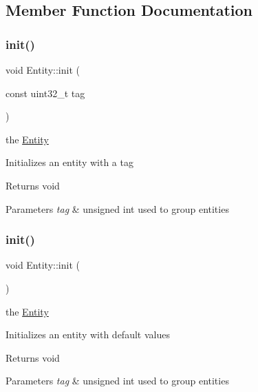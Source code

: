 \subsection{Member Function Documentation}
\mbox{\label{class_entity_a085fa2dd2c2b1f3f60d601a68d5c6773}} 
\subsubsection{\texorpdfstring{init()}{init()}\hspace{0.1cm}{\footnotesize\ttfamily [1/2]}}
{\footnotesize\ttfamily void Entity\+::init (\begin{DoxyParamCaption}\item[{const uint32\+\_\+t}]{tag }\end{DoxyParamCaption})}

the \hyperlink{class_entity}{Entity}

Initializes an entity with a tag

\begin{DoxyReturn}{Returns}
void 
\end{DoxyReturn}

\begin{DoxyParams}{Parameters}
{\em tag} & unsigned int used to group entities \\
\hline
\end{DoxyParams}
\mbox{\label{class_entity_a93bfb0b92c06297c207fad4164810fed}} 
\subsubsection{\texorpdfstring{init()}{init()}\hspace{0.1cm}{\footnotesize\ttfamily [2/2]}}
{\footnotesize\ttfamily void Entity\+::init (\begin{DoxyParamCaption}{ }\end{DoxyParamCaption})}

the \hyperlink{class_entity}{Entity}

Initializes an entity with default values

\begin{DoxyReturn}{Returns}
void 
\end{DoxyReturn}

\begin{DoxyParams}{Parameters}
{\em tag} & unsigned int used to group entities \\
\hline
\end{DoxyParams}
\mbox{\label{class_entity_ad40f9e3ddaa375d33c930c6b57f4c9c5}} 

